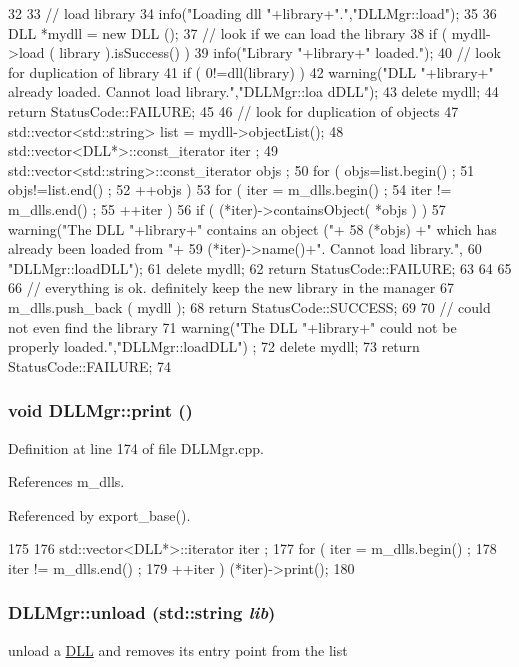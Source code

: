 \begin{DoxyCode}
32                                             {
33   // load library
34   info("Loading dll "+library+".","DLLMgr::load");
35 
36   DLL *mydll = new DLL ();
37   // look if we can load the library
38   if ( mydll->load ( library ).isSuccess() ){
39     info("Library "+library+" loaded.");
40     // look for duplication of library
41     if ( 0!=dll(library) ){
42       warning("DLL "+library+" already loaded. Cannot load library.","DLLMgr::loa
      dDLL");
43       delete mydll;
44       return StatusCode::FAILURE;
45     }
46     // look for duplication of objects
47     std::vector<std::string> list = mydll->objectList();
48     std::vector<DLL*>::const_iterator iter ;
49     std::vector<std::string>::const_iterator objs ;
50     for ( objs=list.begin() ; 
51           objs!=list.end()  ;
52           ++objs ) {
53       for ( iter = m_dlls.begin() ; 
54             iter != m_dlls.end() ; 
55             ++iter ) {
56         if ( (*iter)->containsObject( *objs ) ){
57           warning("The DLL "+library+" contains an object ("+
58                  (*objs) +" which has already been loaded from "+
59                  (*iter)->name()+". Cannot load library.",
60           "DLLMgr::loadDLL");
61           delete mydll;
62           return StatusCode::FAILURE;
63         }
64       }
65     }
66      // everything is ok. definitely keep the new library in the manager     
67      m_dlls.push_back ( mydll );
68      return StatusCode::SUCCESS;
69    }
70    // could not even find the library
71    warning("The DLL "+library+" could not be properly loaded.","DLLMgr::loadDLL")
      ;
72    delete mydll;
73    return StatusCode::FAILURE;
74 }
\end{DoxyCode}
\hypertarget{classDLLMgr_a223c039ca2d098fd825d52b22a9feeb4}{
\subsubsection[{print}]{\setlength{\rightskip}{0pt plus 5cm}void DLLMgr::print ()}}
\label{classDLLMgr_a223c039ca2d098fd825d52b22a9feeb4}


Definition at line 174 of file DLLMgr.cpp.

References m\_\-dlls.

Referenced by export\_\-base().


\begin{DoxyCode}
175 {
176   std::vector<DLL*>::iterator iter ;
177   for ( iter = m_dlls.begin() ; 
178         iter != m_dlls.end()  ; 
179         ++iter ) {(*iter)->print();}
180 }
\end{DoxyCode}
\hypertarget{classDLLMgr_a0e4b881509f638f94cb4d6612578157b}{
\subsubsection[{unload}]{ DLLMgr::unload (std::string {\em lib})}}
\label{classDLLMgr_a0e4b881509f638f94cb4d6612578157b}
unload a \hyperlink{classDLL}{DLL} and removes its entry point from the list 

